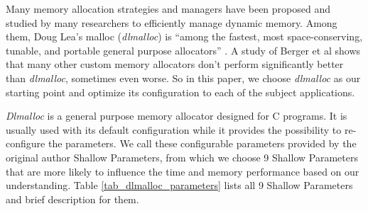 Many memory allocation strategies and managers have been proposed and studied by many researchers to efficiently manage dynamic memory. Among them, Doug Lea's malloc (\emph{dlmalloc}) is ``among the fastest, most space-conserving, tunable, and portable general purpose allocators'' \cite{lea1996memory}. A study of Berger et al \cite{Berger:2002:RCM:582419.582421} shows that many other custom memory allocators don't perform significantly better than \emph{dlmalloc}, sometimes even worse. So in this paper, we choose \emph{dlmalloc} as our starting point and optimize its configuration to each of the subject applications.

\emph{Dlmalloc} is a general purpose memory allocator designed for C programs. It is usually used with its default configuration while it provides the possibility to re-configure the parameters. We call these configurable parameters provided by the original author Shallow Parameters, from which we choose 9 Shallow Parameters that are more likely to influence the time and memory performance based on our understanding. Table \ref{tab_dlmalloc_parameters} lists all 9 Shallow Parameters and brief description for them.


